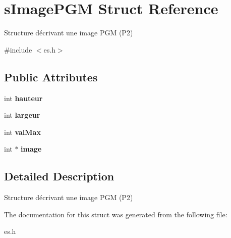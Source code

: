 \hypertarget{structs_image_p_g_m}{}\section{s\+Image\+P\+GM Struct Reference}
\label{structs_image_p_g_m}


Structure décrivant une image P\+GM (P2)  




{\ttfamily \#include $<$es.\+h$>$}

\subsection*{Public Attributes}
\begin{DoxyCompactItemize}
\item 
\mbox{\label{structs_image_p_g_m_a279ca2d304ec535abf850fd9a52e8863}} 
int {\bfseries hauteur}
\item 
\mbox{\label{structs_image_p_g_m_acadef8c95094268e688795988307a442}} 
int {\bfseries largeur}
\item 
\mbox{\label{structs_image_p_g_m_ae48edd2c949f5ee2c1074637162fdaaa}} 
int {\bfseries val\+Max}
\item 
\mbox{\label{structs_image_p_g_m_a28e446738923621479ac9f43501796b7}} 
int $\ast$ {\bfseries image}
\end{DoxyCompactItemize}


\subsection{Detailed Description}
Structure décrivant une image P\+GM (P2) 

The documentation for this struct was generated from the following file\+:\begin{DoxyCompactItemize}
\item 
es.\+h\end{DoxyCompactItemize}
